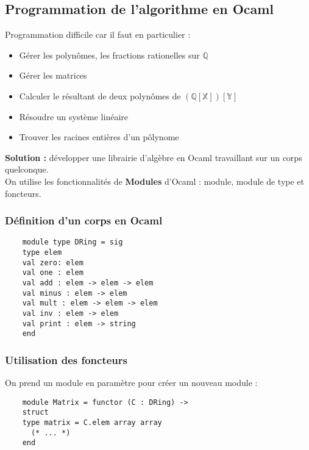 \documentclass[17 pt]{scrartcl}
\begin{document}
\subsection*{Programmation de l'algorithme en \textbf{Ocaml}}
	
	Programmation difficile car il faut en particulier : 
	\begin{itemize}
	\item Gérer les polynômes, les fractions rationelles sur $\mathbb{Q}$
	\item Gérer les matrices
	\item Calculer le résultant de deux polynômes de $\mathbb{(Q[X])[Y]}$
	\item Résoudre un système linéaire
	\item Trouver les racines entières d'un pôlynome
	\end{itemize}
	
	\textbf{Solution : } développer une librairie d'algèbre en Ocaml travaillant sur un corps quelconque. \\
	On utilise les fonctionnalités de \textbf{Modules} d'Ocaml : module, module de type et foncteurs.
	\subsubsection*{Définition d'un corps en Ocaml}
	\begin{lstlisting}
	module type DRing = sig
   	type elem
  	val zero: elem
  	val one : elem
   	val add : elem -> elem -> elem
   	val minus : elem -> elem
    val mult : elem -> elem -> elem
    val inv : elem -> elem
    val print : elem -> string
	end
	\end{lstlisting}
	\subsubsection*{Utilisation des foncteurs}
	On prend un module en paramètre pour créer un nouveau module : 
	\begin{lstlisting}
	module Matrix = functor (C : DRing) ->
  	struct
  	type matrix = C.elem array array
  	  (* ... *)
  	end
  	\end{lstlisting}
\end{document}
